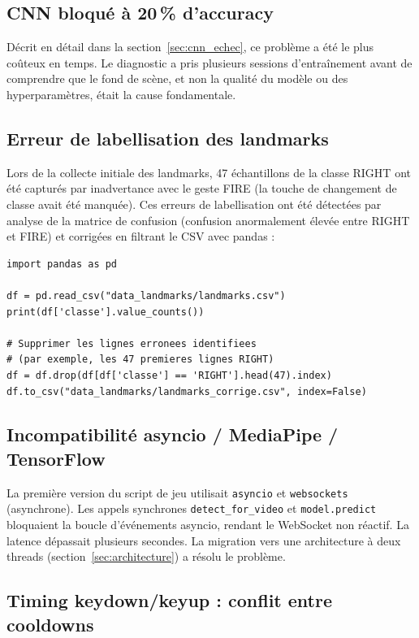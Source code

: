 \documentclass[12pt, a4paper]{article}
\newcommand{\code}[1]{\texttt{\small #1}}
\begin{document}
\subsection{CNN bloqué à 20\,\% d'accuracy}

Décrit en détail dans la section~\ref{sec:cnn_echec}, ce problème a été le plus
coûteux en temps. Le diagnostic a pris plusieurs sessions d'entraînement avant
de comprendre que le fond de scène, et non la qualité du modèle ou des
hyperparamètres, était la cause fondamentale.

\subsection{Erreur de labellisation des landmarks}

Lors de la collecte initiale des landmarks, 47 échantillons de la classe RIGHT
ont été capturés par inadvertance avec le geste FIRE (la touche de changement
de classe avait été manquée). Ces erreurs de labellisation ont été détectées
par analyse de la matrice de confusion (confusion anormalement élevée entre
RIGHT et FIRE) et corrigées en filtrant le CSV avec pandas :

\begin{lstlisting}[caption={Détection et correction d'erreurs de labellisation (pandas)},
                   label=lst:correction]
import pandas as pd

df = pd.read_csv("data_landmarks/landmarks.csv")
print(df['classe'].value_counts())

# Supprimer les lignes erronees identifiees
# (par exemple, les 47 premieres lignes RIGHT)
df = df.drop(df[df['classe'] == 'RIGHT'].head(47).index)
df.to_csv("data_landmarks/landmarks_corrige.csv", index=False)
\end{lstlisting}

\subsection{Incompatibilité asyncio / MediaPipe / TensorFlow}

La première version du script de jeu utilisait \code{asyncio} et
\code{websockets} (asynchrone). Les appels synchrones \code{detect\_for\_video}
et \code{model.predict} bloquaient la boucle d'événements asyncio, rendant
le WebSocket non réactif. La latence dépassait plusieurs secondes. La migration
vers une architecture à deux threads (section~\ref{sec:architecture}) a résolu
le problème.

\subsection{Timing keydown/keyup : conflit entre cooldowns}
\end{document}

